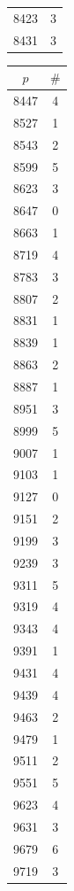 \documentclass[10pt,a4paper]{amsart}
\begin{document}
\begin{table}[htbp]
\begin{minipage}{0.135\textwidth}
\begin{tabular}{c|c}
        8423 & 3 \\
        8431 & 3
    \end{tabular}
\end{minipage}\hspace{-2mm}
%
\begin{minipage}{0.135\textwidth}
    \centering
    \begin{tabular}{c|c}
        $p$ & $\#$ \\ \hline
        8447 & 4 \\
        8527 & 1 \\
        8543 & 2 \\
        8599 & 5 \\
        8623 & 3 \\
        8647 & 0 \\
        8663 & 1 \\
        8719 & 4 \\
        8783 & 3 \\
        8807 & 2 \\
        8831 & 1 \\
        8839 & 1 \\
        8863 & 2 \\
        8887 & 1 \\
        8951 & 3 \\
        8999 & 5 \\
        9007 & 1 \\
        9103 & 1 \\
        9127 & 0 \\
        9151 & 2 \\
        9199 & 3 \\
        9239 & 3 \\
        9311 & 5 \\
        9319 & 4 \\
        9343 & 4 \\
        9391 & 1 \\
        9431 & 4 \\
        9439 & 4 \\
        9463 & 2 \\
        9479 & 1 \\
        9511 & 2 \\
        9551 & 5 \\
        9623 & 4 \\
        9631 & 3 \\
        9679 & 6 \\
        9719 & 3 \\

\end{tabular}
\end{minipage}
\end{table}
\end{document}
